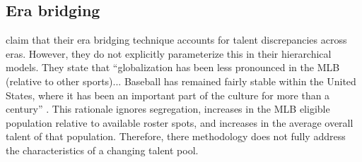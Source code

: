 \documentclass[11pt]{article}\usepackage[]{graphicx}\usepackage[]{color}
\begin{document}





\subsection{Era bridging}

\citet{berry1999eras} claim that their era bridging technique accounts for 
talent discrepancies across eras.  However, they do not explicitly 
parameterize this in their hierarchical models.  They state that 
``globalization has been less pronounced in the MLB (relative to other 
sports)... Baseball has remained fairly stable within the 
United States, where it has been an important part of the culture for more 
than a century'' \citep{berry1999eras}.  This rationale ignores 
segregation, increases in the MLB eligible population 
relative to available roster spots, and increases in the average overall 
talent of that population.  %
Therefore, there methodology does not fully address the characteristics 
of a changing talent pool.  %
\end{document}
